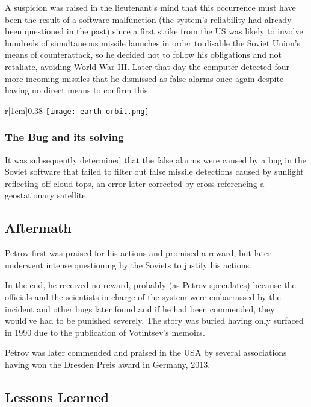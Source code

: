 \documentclass[compilation.tex]{subfiles}
\begin{document}
A suspicion was raised in the lieutenant’s mind that this occurrence must have been the result of a software malfunction (the system’s reliability had already been questioned in the past) since a first strike from the US was likely to involve hundreds of simultaneous missile launches in order to disable the Soviet Union’s means of counterattack, so he decided not to follow his obligations and not retaliate, avoiding World War III.
Later that day the computer detected four more incoming missiles that he dismissed as false alarms once again despite having no direct means to confirm this.

\begin{wrapfigure}[11]{r}[1em]{0.38\textwidth}
	\vspace{\baselineskip}
	\texttt{[image: earth-orbit.png]}
\end{wrapfigure}

\subsubsection{The Bug and its solving}

It was subsequently determined that the false alarms were caused by a bug in the Soviet software that failed to filter out false missile detections caused by sunlight reflecting off cloud-tops, an error later corrected by cross-referencing a geostationary satellite.

\subsection{Aftermath}

Petrov first was praised for his actions and promised a reward, but later underwent intense questioning by the Soviets to justify his actions. 

In the end, he received no reward, probably (as Petrov speculates) because the officials and the scientists in charge of the system were embarrassed by the incident and other bugs later found and if he had been commended,  they would’ve had to be punished severely.
The story was buried having only surfaced in 1990 due to the publication of Votintsev’s memoirs.

Petrov was later commended and praised in the USA by several associations having won the Dresden Preis award in Germany, 2013.

\subsection{Lessons Learned}
\end{document}
